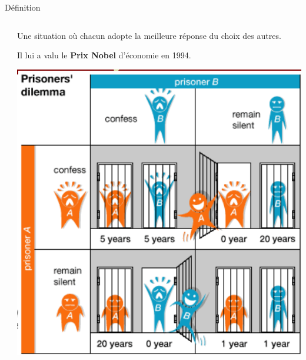 \begin{frame}{Définition}
\begin{columns}
\begin{column}{0.3\textwidth}
	\end{column}
	\begin{column}{0.7\textwidth}
		\begin{itemize}
			\item Une situation o\`{u} chacun adopte la meilleure réponse du choix des autres.
			\only<2->
			{
			\item Il lui a valu le  \textbf{Prix Nobel}  d'économie en 1994.
			}
		\end{itemize}
	\centering
	{
		\includegraphics[width=0.5\linewidth]{resources/prisonier}
	}
	\end{column}   	
\end{columns}
\end{frame}



